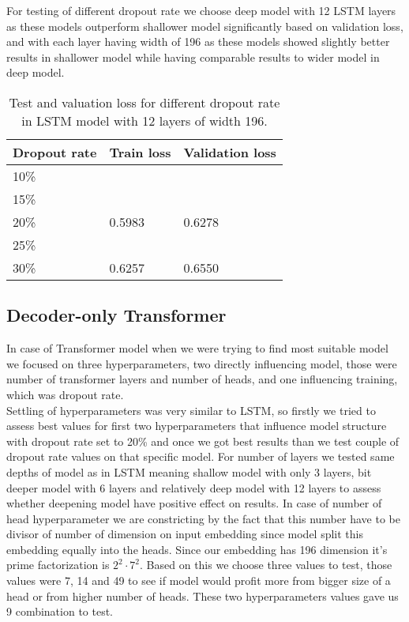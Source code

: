 For testing of different dropout rate we choose deep model with 12 LSTM layers as these models outperform shallower model significantly based on validation loss, and with each layer having width of 196 as these models showed slightly better results in shallower model while having comparable results to wider model in deep model.

\begin{table}[]
	\centering
	\begin{tabular}{|l|l|l|}
		\hline
		Dropout rate & Train loss & Validation loss \\ \hline
		10\%         &     &                 \\ \hline
		15\%         &     &                 \\ \hline
		20\%         & 0.5983    & 0.6278                \\ \hline
		25\%         &     &                 \\ \hline
		30\%         & 0.6257    & 0.6550                \\ \hline 
	\end{tabular}
	\caption{Test and valuation loss for different dropout rate in LSTM model with 12 layers of width 196.}
	\label{tab:lstm_dropout}
\end{table}

\subsection{Decoder-only Transformer}

In case of Transformer model when we were trying to find most suitable model we focused on three hyperparameters, two directly influencing model, those were number of transformer layers and number of heads, and one influencing training, which was dropout rate.
\\

Settling of hyperparameters was very similar to LSTM, so firstly we tried to assess best values for first two hyperparameters that influence model structure with dropout rate set to 20\% and once we got best results than we test couple of dropout rate values on that specific model. For number of layers we tested same depths of model as in LSTM meaning shallow model with only 3 layers, bit deeper model with 6 layers and relatively deep model with 12 layers to assess whether deepening model have positive effect on results. In case of number of head hyperparameter we are constricting by the fact that this number have to be divisor of number of dimension on input embedding since model split this embedding equally into the heads. Since our embedding has 196 dimension it's prime factorization is $2^2\cdot7^2$. Based on this we choose three values to test, those values were 7, 14 and 49 to see if model would profit more from bigger size of a head  or from higher number of heads. These two hyperparameters values gave us 9 combination to test.

